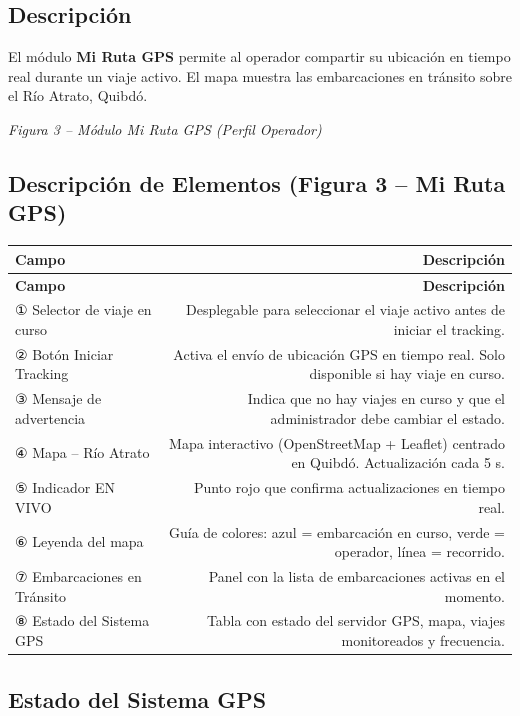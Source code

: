 \documentclass[12pt,a4paper]{article}
\begin{document}
\subsection{Descripción}

El módulo \textbf{Mi Ruta GPS} permite al operador compartir su ubicación en tiempo real durante un viaje activo. El mapa muestra las embarcaciones en tránsito sobre el Río Atrato, Quibdó.

\textit{Figura 3 -- Módulo Mi Ruta GPS (Perfil Operador)}

\subsection{Descripción de Elementos (Figura 3 -- Mi Ruta GPS)}

\begin{longtable}{LR}
  \toprule
  \textbf{Campo} & \textbf{Descripción} \\
  \midrule
  \endfirsthead
  \toprule
  \textbf{Campo} & \textbf{Descripción} \\
  \midrule
  \endhead
  \bottomrule
  \endfoot
  ① Selector de viaje en curso & Desplegable para seleccionar el viaje activo antes de iniciar el tracking. \\[4pt]
  ② Botón Iniciar Tracking     & Activa el envío de ubicación GPS en tiempo real. Solo disponible si hay viaje en curso. \\[4pt]
  ③ Mensaje de advertencia     & Indica que no hay viajes en curso y que el administrador debe cambiar el estado. \\[4pt]
  ④ Mapa -- Río Atrato         & Mapa interactivo (OpenStreetMap + Leaflet) centrado en Quibdó. Actualización cada 5 s. \\[4pt]
  ⑤ Indicador EN VIVO          & Punto rojo que confirma actualizaciones en tiempo real. \\[4pt]
  ⑥ Leyenda del mapa           & Guía de colores: azul = embarcación en curso, verde = operador, línea = recorrido. \\[4pt]
  ⑦ Embarcaciones en Tránsito  & Panel con la lista de embarcaciones activas en el momento. \\[4pt]
  ⑧ Estado del Sistema GPS     & Tabla con estado del servidor GPS, mapa, viajes monitoreados y frecuencia. \\
\end{longtable}

\subsection{Estado del Sistema GPS}
\end{document}
